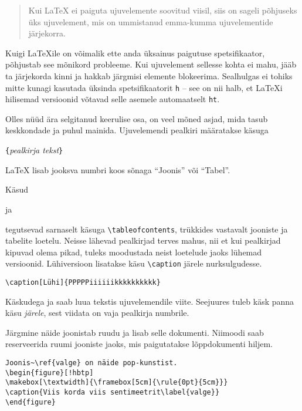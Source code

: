 \begin{quote}
Kui \LaTeX{} ei paiguta ujuvelemente soovitud viisil, siis on sageli
põhjuseks üks ujuvelement, mis on ummistanud emma-kumma ujuvelementide
järjekorra.
\end{quote}

Kuigi \LaTeX ile on võimalik ette anda üksainus paigutuse
spetsifikaator, põhjustab see mõnikord probleeme. Kui ujuvelement
sellesse kohta ei mahu, jääb ta järjekorda kinni ja hakkab järgmisi
elemente blokeerima. Sealhulgas ei tohiks mitte kunagi kasutada üksinda
spetsifikaatorit \verb|h| -- see on nii halb, et \LaTeX i hilisemad
versioonid võtavad selle asemele automaatselt \verb|ht|.

Olles nüüd ära selgitanud keerulise osa, on veel mõned asjad, mida tasub
keskkondade  ja  puhul mainida. Ujuvelemendi
pealkiri määratakse käsuga

\begin{lscommand}
\verb|{|\emph{pealkirja tekst}\verb|}|
\end{lscommand}
\noindent \LaTeX{} lisab jooksva numbri koos sõnaga "`Joonis"' või
"`Tabel"'.

Käsud
\begin{lscommand}
 ja 
\end{lscommand}
\noindent tegutsevad sarnaselt käsuga \verb|\tableofcontents|, trükkides
vastavalt jooniste ja tabelite loetelu. Neisse lähevad pealkirjad terves
mahus, nii et kui pealkirjad kipuvad olema pikad, tuleks moodustada
neist loetelude jaoks lühemad versioonid. Lühiversioon lisatakse käsu
\verb|\caption| järele nurksulgudesse.
\begin{code}
\verb|\caption[Lühi]{PPPPPiiiiiikkkkkkkkkk}|
\end{code}

Käskudega  ja  saab luua tekstis ujuvelemendile viite.
Seejuures tuleb käsk  panna käsu  \emph{järele},
sest viidata on vaja pealkirja numbrile.

Järgmine näide joonistab ruudu ja lisab selle dokumenti. Niimoodi saab
reserveerida ruumi jooniste jaoks, mis paigutatakse lõppdokumenti
hiljem.

\begin{code}
\begin{verbatim}
Joonis~\ref{valge} on näide pop-kunstist.
\begin{figure}[!hbtp]
\makebox[\textwidth]{\framebox[5cm]{\rule{0pt}{5cm}}}
\caption{Viis korda viis sentimeetrit\label{valge}}
\end{figure}
\end{verbatim}
\end{code}

